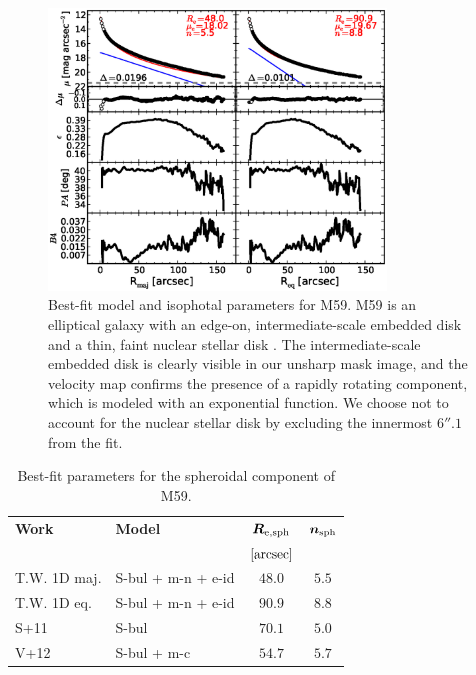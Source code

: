 \documentclass[preprint2]{emulateapj}
\newcommand{\fitfigurewidth}{0.8\textwidth}
\begin{document}
  \begin{figure}[h]
  \begin{center}
  \includegraphics[width=\fitfigurewidth]{images/m59_1Dfit.eps}
  \caption{Best-fit model and isophotal parameters for M59.
  M59 is an elliptical galaxy with an edge-on, intermediate-scale embedded disk \citep{scorzabender1995}
  and a thin, faint nuclear stellar disk \citep{ferrarese2006acsvcs,ledo2010}. 
  The intermediate-scale embedded disk is clearly visible in our unsharp mask image, and 
  the velocity map confirms the presence of a rapidly rotating component, which is modeled with an exponential function.
  We choose not to account for the nuclear stellar disk by excluding the innermost $6''.1$ from the fit.  
  }
  \end{center}
  \end{figure}

  \begin{table}[h]
  \small
  \caption{Best-fit parameters for the spheroidal component of M59.}
  \begin{center}
  \begin{tabular}{llcc}
  \hline
  {\bf Work} & {\bf Model}   & $\bm R_{\rm e,sph}$    & $\bm n_{\rm sph}$ \\
    &  &  $[\rm arcsec]$ & \\
  \hline
  T.W. 1D maj. & S-bul + m-n + e-id & $48.0$  &  $5.5$ \\
  T.W. 1D eq.  & S-bul + m-n + e-id & $90.9$  &  $8.8$ \\
  \hline 
  S+11         & S-bul       & $70.1$  &  $5.0$ \\
  V+12         & S-bul + m-c & $54.7$  &  $5.7$ \\
  \hline
  \end{tabular}
  \end{center}
  \label{tab:m59}
  \end{table}
\end{document}
